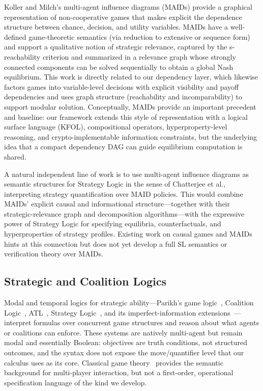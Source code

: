 Koller and Milch's multi-agent influence diagrams (MAIDs) \cite{KOLLER2003181} provide a graphical representation of non-cooperative games that makes explicit the dependence structure between chance, decision, and utility variables. MAIDs have a well-defined game-theoretic semantics (via reduction to extensive or sequence form) and support a qualitative notion of strategic relevance, captured by the s-reachability criterion and summarized in a relevance graph whose strongly connected components can be solved sequentially to obtain a global Nash equilibrium. This work is directly related to our dependency layer, which likewise factors games into variable-level decisions with explicit visibility and payoff dependencies and uses graph structure (reachability and incomparability) to support modular solution. Conceptually, MAIDs provide an important precedent and baseline: our framework extends this style of representation with a logical surface language (KFOL), compositional operators, hyperproperty-level reasoning, and crypto-implementable information constraints, but the underlying idea that a compact dependency DAG can guide equilibrium computation is shared.

A natural independent line of work is to use multi-agent influence diagrams \cite{KOLLER2003181} as semantic structures for Strategy Logic in the sense of Chatterjee et al., interpreting strategy quantification over MAID policies. This would combine MAIDs’ explicit causal and informational structure—together with their strategic-relevance graph and decomposition algorithms—with the expressive power of Strategy Logic for specifying equilibria, counterfactuals, and hyperproperties of strategy profiles. Existing work on causal games and MAIDs hints at this connection but does not yet develop a full SL semantics or verification theory over MAIDs.

\subsection{Strategic and Coalition Logics}
Modal and temporal logics for strategic ability---Parikh’s game logic~\cite{Parikh1985LogicOfGames}, Coalition Logic~\cite{pauly2002modal}, ATL~\cite{AlurHenzingerKupferman2002ATL}, Strategy Logic~\cite{ChatterjeeHenzingerPiterman2010SL}, and its imperfect-information extensions~\cite{BerthonEtAl2021SLii}---interpret formulas over concurrent game structures and reason about what agents or coalitions can enforce.
These systems are natively multi-agent but remain modal and essentially Boolean: objectives are truth conditions, not structured outcomes, and the syntax does not expose the move/quantifier level that our calculus uses as its core.
Classical game theory~\cite{VonNeumannMorgenstern1944,Nash1950,Shapley1953StochasticGames,Harsanyi1967PartI,Harsanyi1968PartII,Harsanyi1968PartIII} provides the semantic background for multi-player interaction, but not a first-order, operational specification language of the kind we develop.

